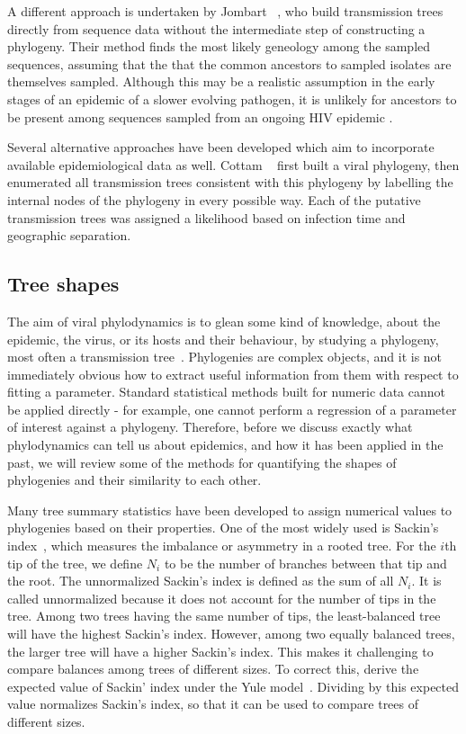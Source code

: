 A different approach is undertaken by Jombart
\etal~\autocite{jombart2011reconstructing}, who build transmission trees
directly from sequence data without the intermediate step of constructing a
phylogeny. Their method finds the most likely geneology among the sampled
sequences, assuming that the that the common ancestors to sampled isolates are
themselves sampled. Although this may be a realistic assumption in the early
stages of an epidemic of a slower evolving pathogen, it is unlikely for
ancestors to be present among sequences sampled from an ongoing HIV epidemic
.

Several alternative approaches have been developed which aim to
incorporate available epidemiological data as well. Cottam
\etal~\autocite{cottam2008integrating} first built a viral phylogeny, then
enumerated all transmission trees consistent with this phylogeny by labelling
the internal nodes of the phylogeny in every possible way. Each of the putative
transmission trees was assigned a likelihood based on infection time and
geographic separation. 


\subsection{Tree shapes}
\label{subsubsec:treeshape}

The aim of viral phylodynamics is to glean some kind of knowledge, about the
epidemic, the virus, or its hosts and their behaviour, by studying a phylogeny,
most often a transmission tree~\autocite{pybus2009evolutionary, volz2013viral}.
Phylogenies are complex objects, and it is not immediately obvious how to
extract useful information from them with respect to fitting a parameter.
Standard statistical methods built for numeric data cannot be applied directly
- for example, one cannot perform a regression of a parameter of interest
against a phylogeny. Therefore, before we discuss exactly what phylodynamics
can tell us about epidemics, and how it has been applied in the past, we will
review some of the methods for quantifying the shapes of phylogenies and their
similarity to each other.

Many tree summary statistics have been developed to assign numerical values to
phylogenies based on their properties. One of the most widely used is Sackin's
index~\cite{shao1990tree}, which measures the imbalance or asymmetry in a
rooted tree. For the $i$th tip of the tree, we define $N_i$ to be the number of
branches between that tip and the root. The unnormalized Sackin's index is
defined as the sum of all $N_i$. It is called unnormalized because it does not
account for the number of tips in the tree. Among two trees having the same
number of tips, the least-balanced tree will have the highest Sackin's index.
However, among two equally balanced trees, the larger tree will have a higher
Sackin's index. This makes it challenging to compare balances among trees of
different sizes. To correct this, \textcite{kirkpatrick1993searching} derive
the expected value of Sackin' index under the Yule
model~\autocite{yule1925mathematical}. Dividing by this expected value
normalizes Sackin's index, so that it can be used to compare trees of different
sizes.

